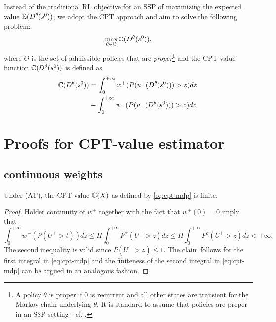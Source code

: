 Instead of the traditional RL objective for an SSP of maximizing the expected value $\mathbb{E} (D^\theta(s^0))$, 
we adopt the CPT approach and aim to solve the following problem: 
$$ \max_{\theta \in \Theta} \mathbb{C}(D^\theta(s^0)),$$
where $\Theta$ is the set of admissible policies that are \textit{proper}\footnote{A policy $\theta$ is proper if $0$ is recurrent and all other states are transient for the Markov chain underlying $\theta$. It is standard to assume that policies are proper in an SSP setting - cf. \cite{bertsekas1995dynamic}.} and the CPT-value function $\mathbb{C}(D^\theta(s^0))$ is defined as
\begin{align}
\mathbb{C}(D^\theta(s^0))& = \int_0^{+\infty} w^+(P(u^+(D^\theta(s^0)))>z) dz \nonumber
\\&- \int_0^{+\infty} w^-(P(u^-(D^\theta(s^0)))>z) dz. \label{eq:cpt-mdp}
\end{align}


\section{Proofs for CPT-value estimator}
\label{appendix:cpt-est}

\subsection{\holder continuous weights}
\label{sec:holder-proofs}
\begin{proposition}
\label{prop:Holder-cpt-finite}
Under (A1'), the CPT-value $\mathbb{C}(X)$ as defined by \eqref{eq:cpt-mdp} is finite. 
\end{proposition}
\begin{proof}

H\"{o}lder continuity of $w^+$ together with the fact that $w^+(0)=0$ imply that 
$$
\int_0^{+\infty} w^+(P(U^+>t)) dz 
\le H \int_0^{+\infty} P^{\alpha} (U^+>z) dz
\le H \int_0^{+\infty} P^{\gamma} (U^+>z) dz 
<+\infty.
$$
The second inequality is valid since $P(U^+>z) \leq 1$. The claim follows for the first integral in \eqref{eq:cpt-mdp} and the finiteness of the second integral in \eqref{eq:cpt-mdp} can be argued in an analogous fashion.
\end{proof}

